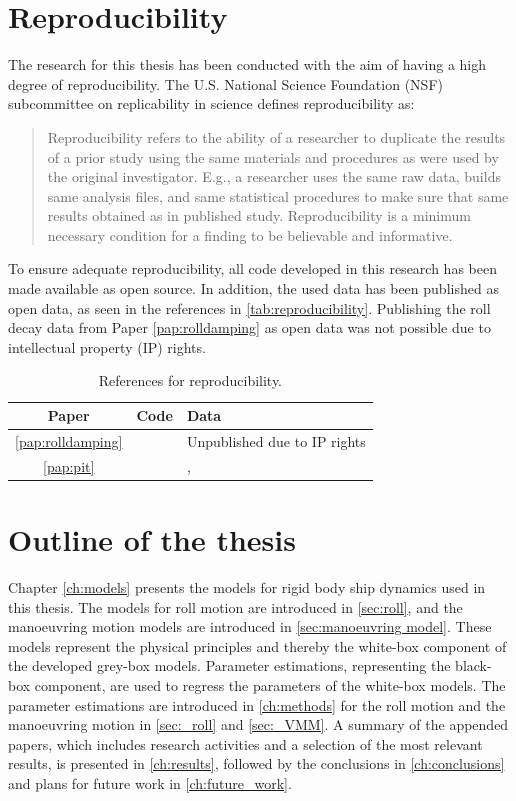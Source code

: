 \section{Reproducibility}
The research for this thesis has been conducted with the aim of having a high degree of reproducibility. The U.S. National Science Foundation (NSF) subcommittee on replicability in science defines reproducibility as:
\begin{quote}
Reproducibility refers to the ability of a researcher to duplicate the results of a prior study
using the same materials and procedures as were used by the original
investigator. 
E.g., a researcher uses the same raw data, builds same analysis files,
and same statistical procedures to make sure that same results
obtained as in published study. Reproducibility is a minimum necessary condition for a finding to be
believable and informative. 
    \cite{bollen_reproducibility_2015}
\end{quote}

\noindent To ensure adequate reproducibility, all code developed in this research has been made available as open source. In addition, the used data has been published as open data, as seen in the references in \autoref{tab:reproducibility}. Publishing the roll decay data from Paper \ref{pap:rolldamping} as open data was not possible due to intellectual property (IP) rights.

\begin{table}[H]
    \centering
    \caption{References for reproducibility.}
    \label{tab:reproducibility}
    \begin{tabular}{ c l l}
        \toprule
         Paper &  Code & Data \\
         \hline
         \ref{pap:rolldamping} & \textcite{alexandersson_rolldecay-estimators_2022} & Unpublished due to IP rights\\
         \ref{pap:pit} & \textcite{alexandersson_code_2022} & \textcite{alexandersson_wpcc_2022}, \textcite{stern_experience_2011} \\
         \bottomrule
    \end{tabular}
\end{table}

\section{Outline of the thesis}
Chapter \ref{ch:models} presents the models for rigid body ship dynamics used in this thesis. The models for roll motion are introduced in \autoref{sec:roll}, and the manoeuvring motion models are introduced in  \autoref{sec:manoeuvring model}. These models represent the physical principles and thereby the white-box component of the developed grey-box models.
Parameter estimations, representing the black-box component, are used to regress the parameters of the white-box models. The parameter estimations are introduced in \autoref{ch:methods} for the roll motion and the manoeuvring motion in \autoref{sec:_roll} and \autoref{sec:_VMM}. 
A summary of the appended papers, which includes research activities and a selection of the most relevant results, is presented in \autoref{ch:results}, followed by the conclusions in \autoref{ch:conclusions} and plans for future work in \autoref{ch:future_work}.